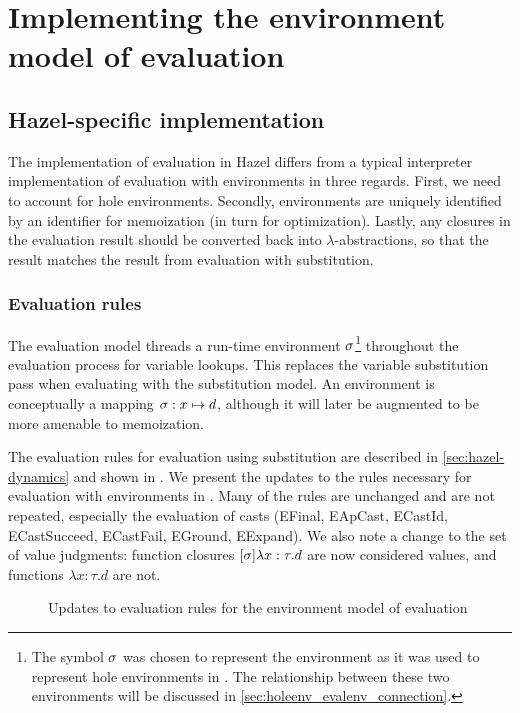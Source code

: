 \chapter{Implementing the environment model of evaluation}
\label{sec:env_model_evaluation}

\section{Hazel-specific implementation}
\label{sec:eval_with_envs}

The implementation of evaluation in Hazel differs from a typical interpreter implementation of evaluation with environments in three regards. First, we need to account for hole environments. Secondly, environments are uniquely identified by an identifier for memoization (in turn for optimization). Lastly, any closures in the evaluation result should be converted back into $\lambda$-abstractions, so that the result matches the result from evaluation with substitution.

\subsection{Evaluation rules}
\label{sec:evalenv-rules}

The evaluation model threads a run-time environment $\sigma$\footnote{The symbol $\sigma$ was chosen to represent the environment as it was used to represent hole environments in \cite{conf/popl/HazelnutLive19}. The relationship between these two environments will be discussed in \cref{sec:holeenv_evalenv_connection}.} throughout the evaluation process for variable lookups. This replaces the variable substitution pass when evaluating with the substitution model. An environment is conceptually a mapping $\sigma:x\mapsto d$, although it will later be augmented to be more amenable to memoization.

The evaluation rules for evaluation using substitution are described in \cref{sec:hazel-dynamics} and shown in . We present the updates to the rules necessary for evaluation with environments in . Many of the rules are unchanged and are not repeated, especially the evaluation of casts (EFinal, EApCast, ECastId, ECastSucceed, ECastFail, EGround, EExpand). We also note a change to the set of value judgments: function closures $[\sigma]\lambda x:\tau.d$ are now considered values, and functions $\lambda x:\tau.d$ are not.

\begin{figure}
  \centering
  \begin{mdframed}
    \begin{singlespace}
      
    \end{singlespace}
  \end{mdframed}
  \caption{Updates to evaluation rules for the environment model of evaluation}
  \label{fig:big-step-formal}
\end{figure}

